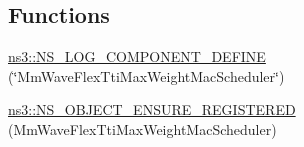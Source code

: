 \subsection*{Functions}
\begin{DoxyCompactItemize}
\item 
\hyperlink{namespacens3_a792ba480817613d080af860d17ac8ad6}{ns3\+::\+N\+S\+\_\+\+L\+O\+G\+\_\+\+C\+O\+M\+P\+O\+N\+E\+N\+T\+\_\+\+D\+E\+F\+I\+NE} (\char`\"{}Mm\+Wave\+Flex\+Tti\+Max\+Weight\+Mac\+Scheduler\char`\"{})
\item 
\hyperlink{namespacens3_ae7a7a32f195ea21b48d7cfd4cc71d94d}{ns3\+::\+N\+S\+\_\+\+O\+B\+J\+E\+C\+T\+\_\+\+E\+N\+S\+U\+R\+E\+\_\+\+R\+E\+G\+I\+S\+T\+E\+R\+ED} (Mm\+Wave\+Flex\+Tti\+Max\+Weight\+Mac\+Scheduler)
\end{DoxyCompactItemize}
